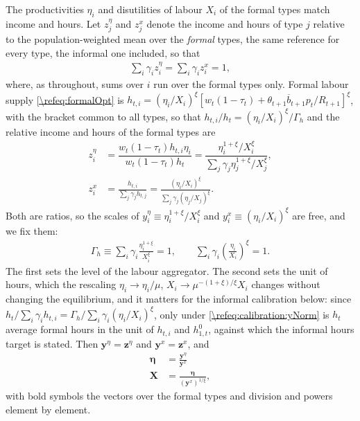 The productivities $\eta_i$ and disutilities of labour $X_i$ of the formal types match income and hours. Let $z_j^{\eta}$ and $z_j^{x}$ denote the income and hours of type $j$ relative to the population-weighted mean over the \emph{formal} types, the same reference for every type, the informal one included, so that
\begin{align}\label{\refeq:calibration:z}
    \sum_{i}\gamma_i z_i^{\eta} = \sum_{i}\gamma_i z_i^{x} = 1,
\end{align}
where, as throughout, sums over $i$ run over the formal types only. Formal labour supply \eqref{\refeq:formalOpt} is $h_{t,i} = (\eta_i/X_i)^{\xi}\left[w_t(1-\tau_t)+\theta_{t+1}\overline{b}_{t+1}p_t/R_{t+1}\right]^{\xi}$, with the bracket common to all types, so that $h_{t,i}/h_t = (\eta_i/X_i)^{\xi}/\Gamma_h$ and the relative income and hours of the formal types are
\begin{align*}
        z_i^{\eta} &= \dfrac{w_t(1-\tau_t)h_{t,i} \eta_i}{w_t(1-\tau_t)h_t} = \dfrac{\eta_i^{1+\xi}/X_i^{\xi}}{\sum_{j} \gamma_ j\eta_j^{1+\xi}/X_j^{\xi}},  \\
        z_i^{x} &= \frac{h_{t,i}}{\sum_j\gamma_j h_{t,j}} = \frac{(\eta_i/X_i)^{\xi}}{\sum_j \gamma_j(\eta_j/X_j)^{\xi}}.
\end{align*}
Both are ratios, so the scales of $y_i^{\eta} \equiv \eta_i^{1+\xi}/X_i^{\xi}$ and $y_i^x \equiv (\eta_i/X_i)^{\xi}$ are free, and we fix them:
\begin{align}\label{\refeq:calibration:yNorm}
    \Gamma_h\equiv\sum_i\gamma_i\frac{\eta_i^{1+\xi}}{X_i^{\xi}} = 1, \qquad \sum_i\gamma_i\left(\frac{\eta_i}{X_i}\right)^{\xi} = 1.
\end{align}
The first sets the level of the labour aggregator. The second sets the unit of hours, which the rescaling $\eta_i\rightarrow\eta_i/\mu$, $X_i\rightarrow\mu^{-(1+\xi)/\xi}X_i$ changes without changing the equilibrium, and it matters for the informal calibration below: since $h_t/\sum_i\gamma_ih_{t,i} = \Gamma_h/\sum_i\gamma_i(\eta_i/X_i)^{\xi}$, only under \eqref{\refeq:calibration:yNorm} is $h_t$ average formal hours in the unit of $h_{t,i}$ and $h_{1,t}^0$, against which the informal hours target is stated. Then $\bm{y}^{\eta} = \bm{z}^{\eta}$ and $\bm{y}^{x} = \bm{z}^{x}$, and
\begin{align}
    \bm{\eta} &= \frac{\bm{y}^{\eta}}{\bm{y}^x} \label{\refeq:calibration:etai} \\
    \bm{X} &= \frac{\bm{\eta}}{(\bm{y}^x)^{1/\xi}}, \label{\refeq:calibration:Xi}
\end{align}
with bold symbols the vectors over the formal types and division and powers element by element.

